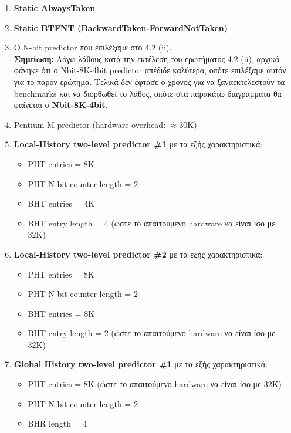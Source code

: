 \documentclass[12pt,a4paper]{article}
\begin{document}
			\begin{enumerate}
				\item \textbf{Static AlwaysTaken}
			
				\item \textbf{Static BTFNT (BackwardTaken-ForwardNotTaken)} 
			
				\item Ο N-bit predictor που επιλέξαμε στο 4.2 (ii). \\
				\textbf{Σημείωση:} Λόγω λάθους κατά την εκτέλεση του ερωτήματος  4.2 (ii), αρχικά φάνηκε ότι ο Nbit-8K-4bit predictor απέδιδε καλύτερα, οπότε επιλέξαμε αυτόν για το παρόν ερώτημα. Τελικά δεν έφτασε ο χρόνος για να ξαναεκτελεστούν τα benchmarks και να διορθωθεί το λάθος, οπότε στα παρακάτω διαγράμματα θα φαίνεται ο \textbf{Nbit-8K-4bit}.
			
				\item Pentium-M predictor (hardware overhead: $\approx$30K)
			
				\item \textbf{Local-History two-level predictor \#1} με τα εξής χαρακτηριστικά:
					\begin{itemize}
						\item PHT entries = 8K
						\item PHT N-bit counter length = 2
						\item BHT entries = 4K
						\item BHT entry length = 4 (ώστε το απαιτούμενο hardware να είναι ίσο με 32K)
					\end{itemize}
			
				\item \textbf{Local-History two-level predictor \#2} με τα εξής χαρακτηριστικά:
					\begin{itemize}
						\item PHT entries = 8K
						\item PHT N-bit counter length = 2
						\item BHT entries = 8K
						\item BHT entry length = 2 (ώστε το απαιτούμενο hardware να είναι ίσο με 32K)
					\end{itemize}
			
				\item \textbf{Global History two-level predictor \#1} με τα εξής χαρακτηριστικά:
					\begin{itemize}
						\item PHT entries = 8K (ώστε το απαιτούμενο hardware να είναι ίσο με 32K)
						\item PHT N-bit counter length = 2
						\item BHR length = 4
					\end{itemize}
			

\end{enumerate}
\end{document}
